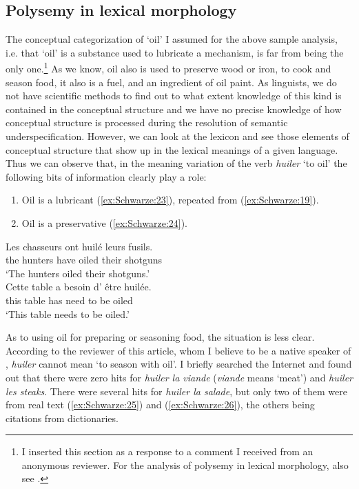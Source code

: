 \documentclass[output=paper]{langsci/langscibook}
\begin{document}
\subsection{Polysemy in lexical morphology}\label{polysemy-in-lexical-morphology}

The conceptual categorization of `oil' I assumed for the above sample analysis, i.e. that `oil' is a substance used to lubricate a mechanism,
is far from being the only one.\footnote{I inserted this section as a response to a comment I received from an anonymous reviewer. For the analysis of polysemy in lexical morphology, also see %
\citet{Schwarze2012}%
%
.} As we know, oil also is used to preserve wood or iron, to cook and season food, it also is a fuel, and an ingredient of oil paint. As linguists, we do not have scientific methods to find out to what extent knowledge of this kind is contained in the conceptual structure and we have no precise knowledge of how conceptual structure is processed during the resolution of semantic underspecification. However, we can look at the lexicon and see those elements of conceptual structure that show up in the lexical meanings of a given language. Thus we can observe that, in the meaning variation of the  verb \emph{huiler} `to oil' the following bits of information clearly play a role:

\begin{enumerate}
\def\labelenumi{\roman{enumi}.}
\item Oil is a lubricant (\ref{ex:Schwarze:23}), repeated from (\ref{ex:Schwarze:19}).

\item Oil is a preservative (\ref{ex:Schwarze:24}).

\end{enumerate}

\ea\label{ex:Schwarze:23} \gll Les chasseurs ont huilé leurs fusils.\\
          the hunters have oiled their shotguns\\
        \glt `The hunters oiled their shotguns.'\\
\ex\label{ex:Schwarze:24} \gll Cette table a besoin d' être huilée.\\
          this table has need to be oiled\\
        \glt `This table needs to be oiled.'\\
\z

As to using oil for preparing or seasoning food, the situation is less clear. According to the reviewer of this article, whom I believe to be a native speaker of , \emph{huiler} cannot mean `to season with oil'. I briefly searched the Internet and found out that there were zero hits for \emph{huiler la viande} (\emph{viande} means `meat') and
\emph{huiler les steaks}. There were several hits for \emph{huiler la salade}, but only two of them were from real text (\ref{ex:Schwarze:25}) and (\ref{ex:Schwarze:26}), the others being citations from dictionaries.
\end{document}
